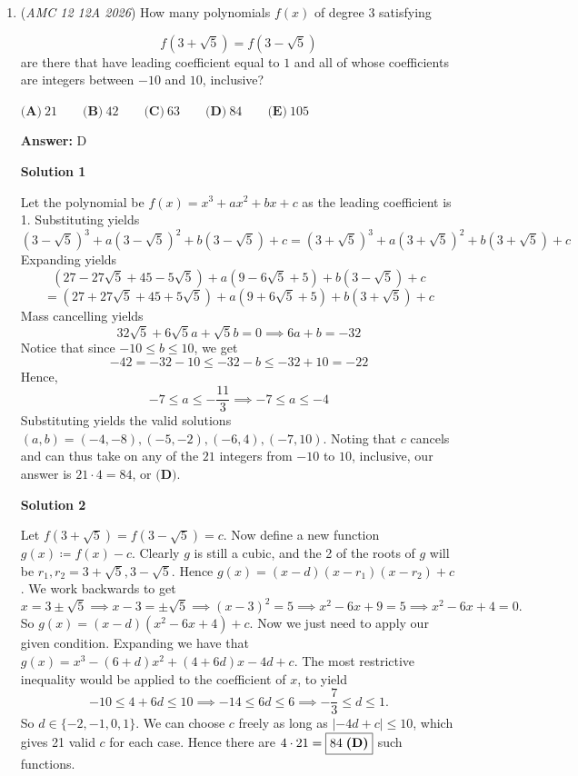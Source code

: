 \begin{enumerate}
 


	\item (\textit{AMC 12 12A 2026}) How many polynomials $f(x)$ of degree $3$ satisfying

 \[f\left( 3+\sqrt{5} \right) = f\left( 3 - \sqrt{5} \right)\]
are there that have leading coefficient equal to $1$ and all of whose coefficients are integers between $-10$ and $10$, inclusive?


 $\textbf{(A)}\   21  \qquad 	\textbf{(B)}\   42  \qquad 	\textbf{(C)}\   63  \qquad 	\textbf{(D)}\   84  \qquad 	\textbf{(E)}\   105$

 \textbf{Answer: }D



\textbf{Solution 1}

Let the polynomial be $f(x)=x^3+ax^2+bx+c$ as the leading coefficient is 1. Substituting yields
 \[\left(3-\sqrt{5}\right)^3+a\left(3-\sqrt{5}\right)^2+b\left(3-\sqrt{5}\right)+c= \left(3+\sqrt{5}\right)^3+a\left(3+\sqrt{5}\right)^2+b\left(3+\sqrt{5}\right)+c\]Expanding yields
 \[(27-27\sqrt{5}+45-5\sqrt{5})+a(9-6\sqrt{5}+5)+b(3-\sqrt{5})+c\]
 \[=(27+27\sqrt{5}+45+5\sqrt{5})+a(9+6\sqrt{5}+5)+b(3+\sqrt{5})+c\]Mass cancelling yields
 \[32\sqrt{5}+6\sqrt{5}a+\sqrt{5}b=0\implies 6a+b=-32\]Notice that since $-10\le b\le 10$, we get
 \[-42= -32-10\le -32-b\le -32+10=-22\]Hence,
 \[-7\le a\le -\frac{11}{3}\implies -7\le a\le -4\]Substituting yields the valid solutions $(a,b)=(-4,-8),(-5,-2),(-6,4),(-7,10)$. Noting that $c$ cancels and can thus take on any of the $21$ integers from $-10$ to $10$, inclusive, our answer is $21\cdot 4=84$, or $\boxed{\textbf{(D)}}$.

 



\textbf{Solution 2}

Let $f\left(3+\sqrt 5\right)=f\left(3-\sqrt 5\right)=c$. Now define a new function $g(x)\coloneqq f(x)-c$. Clearly $g$ is still a cubic, and the 2 of the roots of $g$ will be $r_1, r_2=3+\sqrt 5, 3-\sqrt 5$. Hence $g(x)=(x-d)(x-r_1)(x-r_2)+c$. We work backwards to get 
 \[x=3\pm\sqrt 5\implies x-3=\pm\sqrt 5\implies (x-3)^2=5\implies x^2-6x+9=5\implies x^2-6x+4=0.\] So $g(x)=(x-d)(x^2-6x+4)+c$. Now we just need to apply our given condition. Expanding we have that $g(x)=x^3-(6+d)x^2+(4+6d)x-4d+c$. The most restrictive inequality would be applied to the coefficient of $x$, to yield 
 \[-10\le 4+6d\le 10\implies -14\le 6d\le 6\implies -\frac73\le d\le 1.\]So $d\in\{-2, -1, 0, 1\}$. We can choose $c$ freely as long as $|-4d+c|\le 10$, which gives 21 valid $c$ for each case. Hence there are $4\cdot 21=\boxed{84\hspace{1mm}\textbf{(D)}}$ such functions. 


\end{enumerate}

